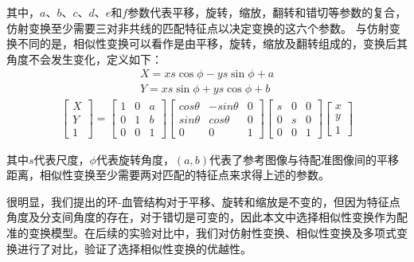 其中，$a$、$b$、$c$、$d$、$e$和$f$参数代表平移，旋转，缩放，翻转和错切等参数的复合，仿射变换至少需要三对非共线的匹配特征点以决定变换的这六个参数。
与仿射变换不同的是，相似性变换可以看作是由平移，旋转，缩放及翻转组成的，变换后其角度不会发生变化，定义如下：
\begin{equation}
\begin{split}		
X=xs\cos\phi-ys\sin\phi+a\\
Y=xs\sin\phi+ys\cos\phi+b	
\end{split}
\end{equation}
 \begin{align}
\left[ \begin{array}{c}
X \\
Y \\
1   
\end{array} \right]
=
\left[ \begin{array}{ccc}
1 & 0 & a\\
0 & 1 & b \\
0 & 0 & 1
\end{array} \right]
\left[ \begin{array}{ccc}
cos\theta & -sin\theta & 0 \\
sin\theta & cos\theta & 0 \\
0 & 0 & 1
\end{array} \right]
\left[ \begin{array}{ccc}
s & 0 & 0\\
0 & s & 0 \\
0 & 0 & 1
\end{array} \right]
\left[ \begin{array}{c}
x \\
y\\
1
\end{array} \right]
\end{align}

其中$s$代表尺度，$\phi$代表旋转角度，$(a,b)$代表了参考图像与待配准图像间的平移距离，相似性变换至少需要两对匹配的特征点来求得上述的参数。

很明显，我们提出的环-血管结构对于平移、旋转和缩放是不变的，但因为特征点角度及分支间角度的存在，对于错切是可变的，因此本文中选择相似性变换作为配准的变换模型。在后续的实验对比中，我们对仿射性变换、相似性变换及多项式变换进行了对比，验证了选择相似性变换的优越性。

